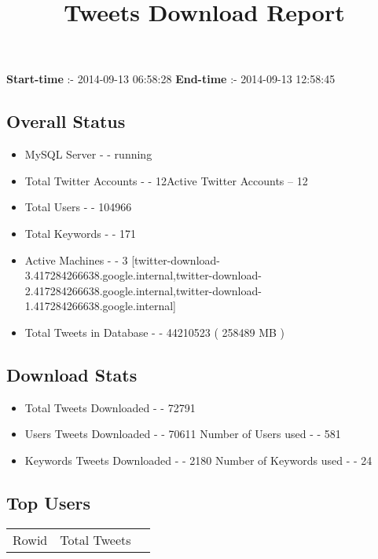 \documentclass{article}\usepackage[T1]{fontenc}
\begin{document}
\title{\textbf{Tweets Download Report}}
               \date{}
                \maketitle
               \centerline{\textbf{Start-time} :- 2014-09-13 06:58:28 \hspace{40pt} \textbf{End-time} :- 2014-09-13 12:58:45}               \subsection*{Overall Status}                \begin{itemize}                \item MySQL Server - - running               \item Total Twitter Accounts - - 12\newline Active Twitter Accounts -- 12               \item Total Users - - 104966               \item Total Keywords - - 171               \item Active Machines - - 3 [twitter-download-3.417284266638.google.internal,twitter-download-2.417284266638.google.internal,twitter-download-1.417284266638.google.internal]               \item Total Tweets in Database - - 44210523 ( 258489 MB )               \end{itemize}               \subsection*{Download Stats}                \begin{itemize}                \item Total Tweets Downloaded - - 72791               \item Users Tweets Downloaded - - 70611 \newline Number of Users used - - 581               \item Keywords Tweets Downloaded - - 2180 \newline Number of Keywords used - - 24              \end{itemize}              \subsection*{Top Users}\begin{tabular}{|c|c|c|}         \hline         Rowid & Total Tweets \\ 

\end{tabular}
\end{document}
